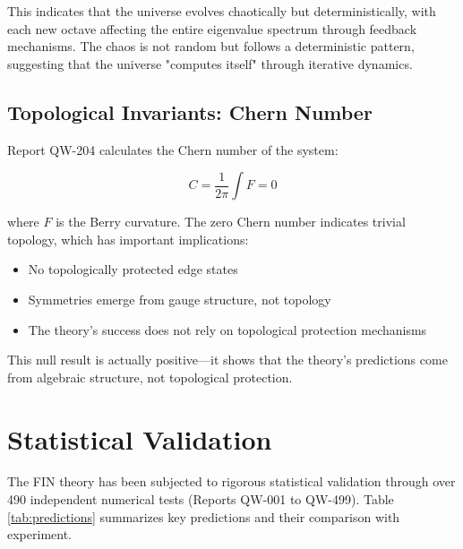\documentclass[11pt, a4paper]{article}
\begin{document}
This indicates that the universe evolves chaotically but deterministically, with each new octave affecting the entire eigenvalue spectrum through feedback mechanisms. The chaos is not random but follows a deterministic pattern, suggesting that the universe "computes itself" through iterative dynamics.

\subsection{Topological Invariants: Chern Number}

Report QW-204 calculates the Chern number of the system:

\begin{equation}
C = \frac{1}{2\pi}\int F = 0
\end{equation}

where $F$ is the Berry curvature. The zero Chern number indicates trivial topology, which has important implications:
\begin{itemize}
    \item No topologically protected edge states
    \item Symmetries emerge from gauge structure, not topology
    \item The theory's success does not rely on topological protection mechanisms
\end{itemize}

This null result is actually positive—it shows that the theory's predictions come from algebraic structure, not topological protection.

\section{Statistical Validation}

The FIN theory has been subjected to rigorous statistical validation through over 490 independent numerical tests (Reports QW-001 to QW-499). Table \ref{tab:predictions} summarizes key predictions and their comparison with experiment.
\end{document}
